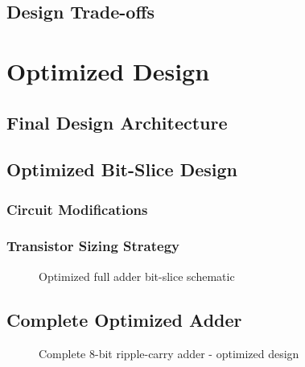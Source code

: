 \documentclass[12pt,letterpaper]{article}
\begin{document}
\subsection{Design Trade-offs}


\section{Optimized Design}
\label{sec:optimized}


\subsection{Final Design Architecture}

\subsection{Optimized Bit-Slice Design}

\subsubsection{Circuit Modifications}

\subsubsection{Transistor Sizing Strategy}

\begin{figure}[H]
    \centering
    \caption{Optimized full adder bit-slice schematic}
    \label{fig:optimized_bitslice}
\end{figure}

\subsection{Complete Optimized Adder}

\begin{figure}[H]
    \centering
    \caption{Complete 8-bit ripple-carry adder - optimized design}
    \label{fig:optimized_8bit}
\end{figure}
\end{document}
